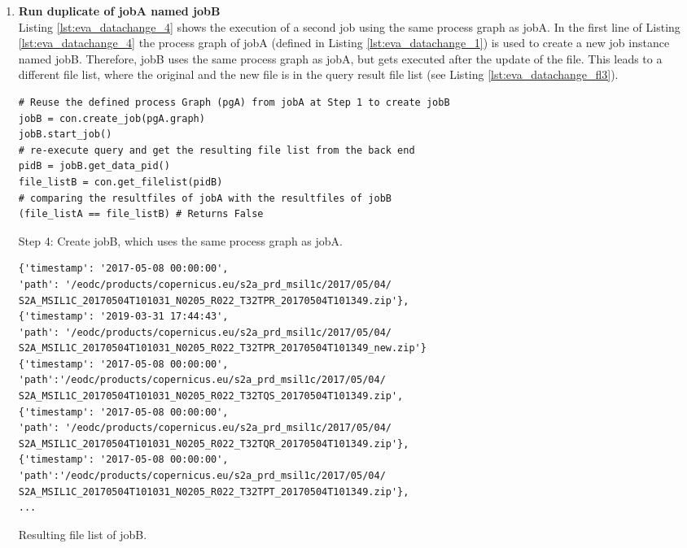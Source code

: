 \documentclass[draft,final]{vutinfth} %
\newenvironment{code}{\captionsetup{type=listing}}{}
\begin{document}
\begin{enumerate}
	\item \textbf{Run duplicate of jobA named jobB} \\
Listing \ref{lst:eva_datachange_4} shows the execution of a second job using the same process graph as jobA. In the first line of Listing \ref{lst:eva_datachange_4} the process graph of jobA (defined in Listing \ref{lst:eva_datachange_1}) is used to create a new job instance named jobB. Therefore, jobB uses the same process graph as jobA, but gets executed after the update of the file. This leads to a different file list, where the original and the new file is in the query result file list (see Listing \ref{lst:eva_datachange_fl3}).
	\begin{code}
		\begin{verbatim}
# Reuse the defined process Graph (pgA) from jobA at Step 1 to create jobB
jobB = con.create_job(pgA.graph)
jobB.start_job()
# re-execute query and get the resulting file list from the back end
pidB = jobB.get_data_pid()
file_listB = con.get_filelist(pidB)
# comparing the resultfiles of jobA with the resultfiles of jobB
(file_listA == file_listB) # Returns False
		\end{verbatim}
		\caption{Step 4: Create jobB, which uses the same process graph as jobA.}
		\label{lst:eva_datachange_4}
	\end{code}

	\begin{code}
	\begin{verbatim}
{'timestamp': '2017-05-08 00:00:00', 
'path': '/eodc/products/copernicus.eu/s2a_prd_msil1c/2017/05/04/
S2A_MSIL1C_20170504T101031_N0205_R022_T32TPR_20170504T101349.zip'}, 
{'timestamp': '2019-03-31 17:44:43', 
'path': '/eodc/products/copernicus.eu/s2a_prd_msil1c/2017/05/04/
S2A_MSIL1C_20170504T101031_N0205_R022_T32TPR_20170504T101349_new.zip'}
{'timestamp': '2017-05-08 00:00:00',
'path':'/eodc/products/copernicus.eu/s2a_prd_msil1c/2017/05/04/
S2A_MSIL1C_20170504T101031_N0205_R022_T32TQS_20170504T101349.zip', 
{'timestamp': '2017-05-08 00:00:00', 
'path': '/eodc/products/copernicus.eu/s2a_prd_msil1c/2017/05/04/
S2A_MSIL1C_20170504T101031_N0205_R022_T32TQR_20170504T101349.zip'}, 
{'timestamp': '2017-05-08 00:00:00',
'path':'/eodc/products/copernicus.eu/s2a_prd_msil1c/2017/05/04/
S2A_MSIL1C_20170504T101031_N0205_R022_T32TPT_20170504T101349.zip'},
...
	\end{verbatim}
	\caption{Resulting file list of jobB.}
	\label{lst:eva_datachange_fl3}
\end{code}


\end{enumerate}
\end{document}
